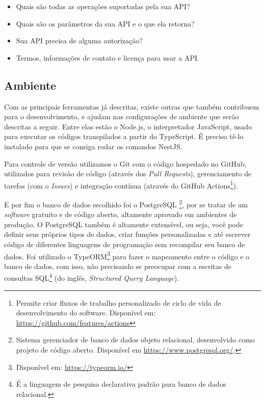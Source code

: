 \begin{itemize}
    \item Quais são todas as operações suportadas pela sua API? 
    \item Quais são os parâmetros da sua API e o que ela retorna?   
    \item Sua API precisa de alguma autorização?
    \item Termos, informações de contato e licença para usar a API.
\end{itemize}

\subsection{Ambiente}
\label{ssec:Ambiente}
Com as principais ferramentas já descritas, existe outras que também contribuem para o desenvolvimento, e ajudam nas configurações de ambiente que serão descritas a seguir. Entre elas estão o Node.js, o interpretador JavaScript, usado para executar os códigos transpilados a partir do TypeScript. É preciso tê-lo instalado para que se consiga rodar os comandos NestJS.

Para controle de versão utilizamos o Git com o código hospedado no GitHub, utilizados para revisão de código (através dos \textit{Pull Requests}), gerenciamento de tarefas (com o \textit{Issues}) e integração contínua (através do GitHub Actions\footnote{Permite criar fluxos de trabalho personalizado de ciclo de vida de desenvolvimento do software. Disponível em: \url{https://github.com/features/actions}}). 

E por fim o banco de dados escolhido foi o PostgreSQL \footnote{Sistema gerenciador de banco de dados objeto relacional, desenvolvido como projeto de código aberto. Disponível em \url{https://www.postgresql.org/}.}, por se tratar de um \textit{software} gratuito e de código aberto, altamente aprovado em ambientes de produção. O PostgreSQL também é altamente extensível, ou seja, você pode definir seus próprios tipos de dados, criar funções personalizadas e até escrever código de diferentes linguagens de programação sem recompilar seu banco de dados. Foi utilizado o TypeORM\footnote{Disponível em: \url{https://typeorm.io/}} para fazer o mapeamento entre o código e o banco de dados, com isso, não precisando se preocupar com a escritas de consultas SQL\footnote{É a linguagem de pesquisa declarativa padrão para banco de dados relacional.} (do inglês, \textit{Structured Query Language}).
